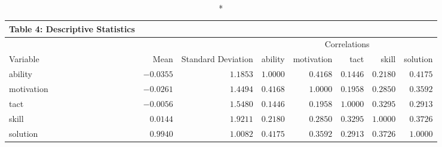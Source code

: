 \begin{longtable}{lrrrrrrr}
\caption*{
{\large Table 4: Descriptive Statistics}
} \\ 
\toprule
 &  &  & \multicolumn{5}{c}{Correlations} \\ 
\cmidrule(lr){4-8}
Variable & Mean & Standard Deviation & ability & motivation & tact & skill & solution \\ 
\midrule\addlinespace[2.5pt]
ability & $-0.0355$ & $1.1853$ & $1.0000$ & $0.4168$ & $0.1446$ & $0.2180$ & $0.4175$ \\ 
motivation & $-0.0261$ & $1.4494$ & $0.4168$ & $1.0000$ & $0.1958$ & $0.2850$ & $0.3592$ \\ 
tact & $-0.0056$ & $1.5480$ & $0.1446$ & $0.1958$ & $1.0000$ & $0.3295$ & $0.2913$ \\ 
skill & $0.0144$ & $1.9211$ & $0.2180$ & $0.2850$ & $0.3295$ & $1.0000$ & $0.3726$ \\ 
solution & $0.9940$ & $1.0082$ & $0.4175$ & $0.3592$ & $0.2913$ & $0.3726$ & $1.0000$ \\ 
\bottomrule
\end{longtable}

